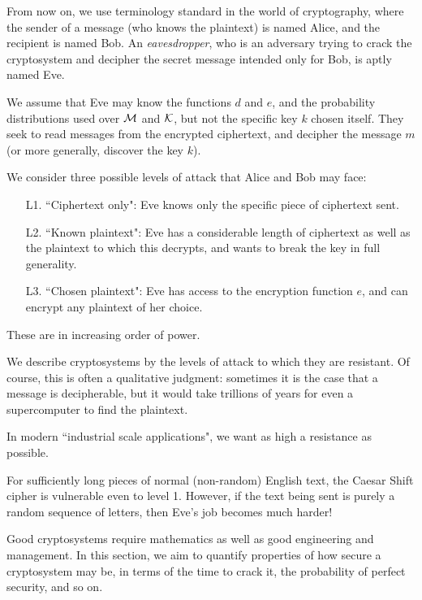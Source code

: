 \documentclass{article}
\begin{document}
\begin{remark}
	\label{three-levels-of-attack}
    From now on, we use terminology standard in the world of cryptography, where the sender of a message (who knows the plaintext) is named Alice, and the recipient is named Bob. An \textit{eavesdropper}, who is an adversary trying to crack the cryptosystem and decipher the secret message intended only for Bob, is aptly named Eve.
    
    We assume that Eve may know the functions $d$ and $e$, and the probability distributions used over $\mathcal{M}$ and $\mathcal{K}$, but not the specific key $k$ chosen itself. They seek to read messages from the encrypted ciphertext, and decipher the message $m$ (or more generally, discover the key $k$).
    
    We consider three possible levels of attack that Alice and Bob may face:
    \begin{enumerate}
	    \item[L1.]  ``Ciphertext only": Eve knows only the specific piece of ciphertext sent.
	    \item[L2.] ``Known plaintext": Eve has a considerable length of ciphertext as well as the plaintext to which this decrypts, and wants to break the key in full generality.
	    \item[L3.] ``Chosen plaintext": Eve has access to the encryption function $e$, and can encrypt any plaintext of her choice.
	\end{enumerate}
	These are in increasing order of power.
	
	We describe cryptosystems by the levels of attack to which they are resistant. Of course, this is often a qualitative judgment: sometimes it is the case that a message is decipherable, but it would take trillions of years for even a supercomputer to find the plaintext.
	
	In modern ``industrial scale applications", we want as high a resistance as possible.
	
	For sufficiently long pieces of normal (non-random) English text, the Caesar Shift cipher is vulnerable even to level 1. However, if the text being sent is purely a random sequence of letters, then Eve's job becomes much harder!
	
	Good cryptosystems require mathematics as well as good engineering and management. In this section, we aim to quantify properties of how secure a cryptosystem may be, in terms of the time to crack it, the probability of perfect security, and so on.
\end{remark}
\end{document}
